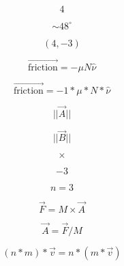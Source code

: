 \documentclass[12pt, a4paper]{article}
\begin{document}
\begin{equation}
\label{four}
4
\end{equation}

\begin{equation}
\label{foureightdeg}
\sim 48^\circ
\end{equation}

\begin{equation}
\label{fourthree}
(4, -3)
\end{equation}

\begin{equation}
\label{friction1}
\vec{\textrm{friction}} = -\mu N \hat{\nu}
\end{equation}

\begin{equation}
\label{friction2}
\vec{\textrm{friction}} = -1 * \mu * N * \hat{\nu}
\end{equation}

\begin{equation}
\label{maga}
||\vec{A}||
\end{equation}

\begin{equation}
\label{magb}
||\vec{B}||
\end{equation}

\begin{equation}
\label{mult}
\times
\end{equation}

\begin{equation}
\label{negthree}
-3
\end{equation}

\begin{equation}
\label{nequals}
n = 3
\end{equation}

\begin{equation}
\label{newton2a}
\vec{F} = M \times \vec{A}
\end{equation}

\begin{equation}
\label{newton2b}
\vec{A} = \vec{F} / M
\end{equation}

\begin{equation}
\label{nmtimesv1}
(n * m) * \vec{v} = n * (m * \vec{v})
\end{equation}
\end{document}

